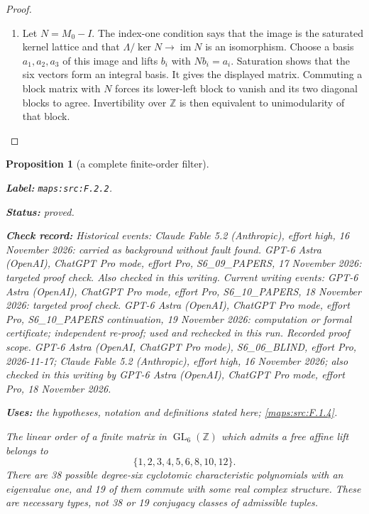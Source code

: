 \documentclass[11pt,a4paper]{article}
\newtheorem{proposition}[proposition]{Proposition}
\theoremstyle{definition}
\newcommand{\StatementRecord}[4]{\par\smallskip\begingroup\upshape\raggedright\noindent\textbf{Label:} \nolinkurl{#1}.\par\noindent\textbf{Status:} #2.\par\noindent\textbf{Check record:} #3.\par\noindent\textbf{Uses:} #4.\par\endgroup\smallskip}
\begin{document}
\begin{proof}
\begin{enumerate}[label=\arabic*.]
\item Let $N=M_0-I$.  The index-one condition says that the image
is the saturated kernel lattice and that
$\Lambda/\ker N\to\operatorname{im}N$ is an isomorphism.
Choose a basis $a_1,a_2,a_3$ of this image and lifts $b_i$ with
$Nb_i=a_i$.  Saturation shows that the six vectors form an
integral basis.  It gives the displayed matrix.  Commuting a
block matrix with $N$ forces its lower-left block to vanish
and its two diagonal blocks to agree.  Invertibility over
$\mathbb Z$ is then equivalent to unimodularity of that block.

\end{enumerate}
\end{proof}




\begin{proposition}[a complete finite-order filter]\label{maps:src:F.2.2}
\StatementRecord{maps:src:F.2.2}{proved}{Historical events: Claude Fable 5.2 (Anthropic), effort high, 16 November 2026: carried as background without fault found. GPT-6 Astra (OpenAI), ChatGPT Pro mode, effort Pro, S6\_09\_PAPERS, 17 November 2026: targeted proof check. Also checked in this writing. Current writing events: GPT-6 Astra (OpenAI), ChatGPT Pro mode, effort Pro, S6\_10\_PAPERS, 18 November 2026: targeted proof check. GPT-6 Astra (OpenAI), ChatGPT Pro mode, effort Pro, S6\_10\_PAPERS continuation, 19 November 2026: computation or formal certificate; independent re-proof; used and rechecked in this run. \emph{Recorded proof scope.} GPT-6 Astra (OpenAI, ChatGPT Pro mode), S6\_06\_BLIND, effort Pro, 2026-11-17; Claude Fable 5.2 (Anthropic), effort high, 16 November 2026; also checked in this writing by GPT-6 Astra (OpenAI), ChatGPT Pro mode, effort Pro, 18 November 2026}{the hypotheses, notation and definitions stated here; \cref{maps:src:F.1.4}}


The linear order of a finite matrix in $\operatorname{GL}_6(\mathbb Z)$
which admits a free affine lift belongs to
\[
 \{1,2,3,4,5,6,8,10,12\}.
 \tag{F.3}\label{maps:eq:F.3}
\]
There are 38 possible degree-six cyclotomic characteristic
polynomials with an eigenvalue one, and 19 of them commute
with some real complex structure.  These are necessary types,
not 38 or 19 conjugacy classes of admissible tuples.

\end{proposition}
\end{document}
